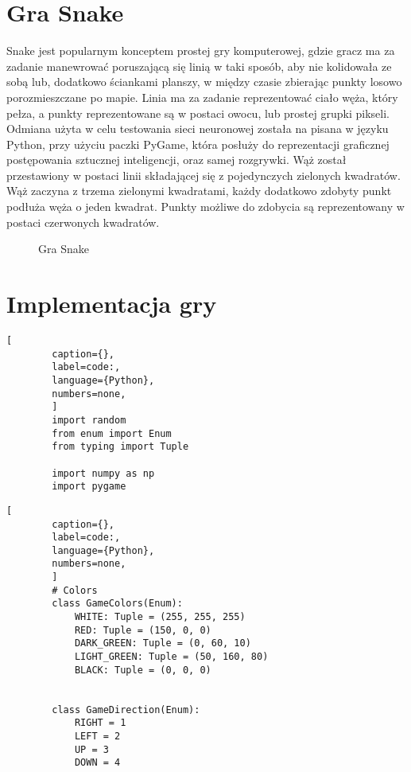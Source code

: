 


\section{Gra Snake}

Snake \cite{SnakeGame} jest popularnym konceptem prostej gry komputerowej, gdzie gracz ma za zadanie manewrować poruszającą się linią w taki sposób, aby nie kolidowała ze sobą lub, dodatkowo ściankami planszy, w między czasie zbierając punkty losowo porozmieszczane po mapie. Linia ma za zadanie reprezentować ciało węża, który pełza, a punkty reprezentowane są w postaci owocu, lub prostej grupki pikseli.
Odmiana użyta w celu testowania sieci neuronowej została na pisana w języku Python, przy użyciu paczki PyGame, która posłuży do reprezentacji graficznej postępowania sztucznej inteligencji, oraz samej rozgrywki.
Wąż został przestawiony w postaci linii składającej się z pojedynczych zielonych kwadratów. Wąż zaczyna z trzema zielonymi kwadratami, każdy dodatkowo zdobyty punkt podłuża węża o jeden kwadrat. Punkty możliwe do zdobycia są reprezentowany w postaci czerwonych kwadratów.

\begin{figure}[h!]
    \centering
    \caption{Gra Snake}
    \label{img:snake_game}
\end{figure}


\section{Implementacja gry}

\begin{onepage}
    \begin{lstlisting}[
        caption={},
        label=code:,
        language={Python},
        numbers=none,
        ]
        import random
        from enum import Enum
        from typing import Tuple
        
        import numpy as np
        import pygame
    \end{lstlisting}
\end{onepage}

\begin{onepage}
    \begin{lstlisting}[
        caption={},
        label=code:,
        language={Python},
        numbers=none,
        ]
        # Colors
        class GameColors(Enum):
            WHITE: Tuple = (255, 255, 255)
            RED: Tuple = (150, 0, 0)
            DARK_GREEN: Tuple = (0, 60, 10)
            LIGHT_GREEN: Tuple = (50, 160, 80)
            BLACK: Tuple = (0, 0, 0)
        
        
        class GameDirection(Enum):
            RIGHT = 1
            LEFT = 2
            UP = 3
            DOWN = 4
        
    \end{lstlisting}
\end{onepage}


